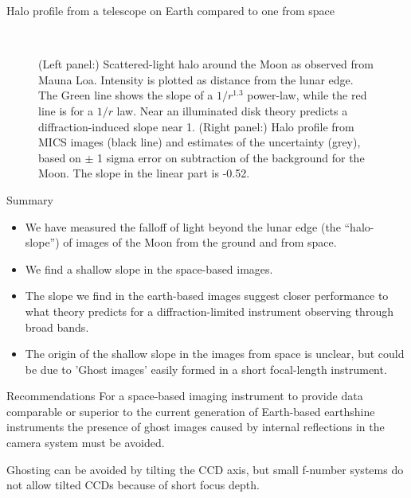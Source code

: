\documentclass[final,hyperref={pdfpagelabels=false}]{beamer}
\begin{document}
\begin{frame}[t]
\begin{columns}[t]
\begin{column}{.23\textwidth}
\begin{block}{Halo profile from a telescope on Earth compared to one from space}
\begin{figure}
\caption{ (Left panel:) Scattered-light halo around the Moon as observed from Mauna Loa. Intensity is plotted as distance from the lunar edge. The Green line shows the slope of a $1/r^{1.3}$ power-law, while the red line is for a $1/r$ law. Near an illuminated disk theory predicts a diffraction-induced slope near 1. (Right panel:) Halo profile from MICS images (black line) and estimates of the uncertainty (grey), based on $\pm$ 1 sigma error on subtraction of the background for the Moon. The slope in the linear part is -0.52. }~\label{fig:MLOresult}
\end{figure}

\end{block}
\begin{block}{Summary}
\begin{itemize}
    \item We have measured the falloff of light beyond the lunar edge (the ``halo-slope'') of images of the Moon from the ground and from space.
    \item We find a shallow slope in the space-based images.
    \item The slope we find in the earth-based images suggest closer performance to what theory predicts for a diffraction-limited instrument observing through broad bands.
    \item The origin of the shallow slope in the images from space is unclear, but could be due to 'Ghost images' easily formed in a short focal-length instrument.
\end{itemize}

\end{block}

\begin{block}{Recommendations}
For a space-based imaging instrument to provide data comparable or superior to the current generation of Earth-based earthshine instruments the presence of ghost images caused by internal reflections in the camera system must be avoided.

Ghosting can be avoided by tilting the CCD axis,
    but small f-number systems do not allow tilted CCDs because of short focus depth.


\end{block}
\end{column}
\end{columns}
\end{frame}
\end{document}
